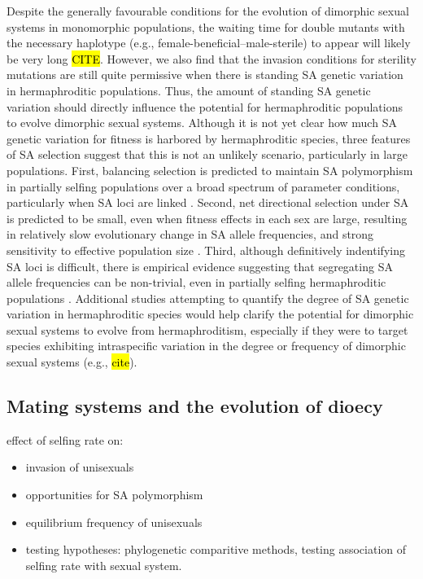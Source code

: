 \documentclass[9pt,twocolumn,twoside,lineno]{gsajnl}
\begin{document}
Despite the generally favourable conditions for the evolution of dimorphic sexual systems in monomorphic populations, the waiting time for double mutants with the necessary haplotype (e.g., female-beneficial--male-sterile) to appear will likely be very long \hl{CITE}. However, we also find that the invasion conditions for sterility mutations are still quite permissive when there is standing SA genetic variation in hermaphroditic populations. Thus, the amount of standing SA genetic variation should directly influence the potential for hermaphroditic populations to evolve dimorphic sexual systems. Although it is not yet clear how much SA genetic variation for fitness is harbored by hermaphroditic species, three features of SA selection suggest that this is not an unlikely scenario, particularly in large populations. First, balancing selection is predicted to maintain SA polymorphism in partially selfing populations over a broad spectrum of parameter conditions, particularly when SA loci are linked \citep{Patten2010,JordanConnallon2014,Olito2017}. Second, net directional selection under SA is predicted to be small, even when fitness effects in each sex are large, resulting in relatively slow evolutionary change in SA allele frequencies, and strong sensitivity to effective population size \citep{ConnallonClark2012}. Third, although definitively indentifying SA loci is difficult, there is empirical evidence suggesting that segregating SA allele frequencies can be non-trivial, even in partially selfing hermaphroditic populations \citep{Barson2015,LeeKelly2015}. Additional studies attempting to quantify the degree of SA genetic variation in hermaphroditic species would help clarify the potential for dimorphic sexual systems to evolve from hermaphroditism, especially if they were to target species exhibiting intraspecific variation in the degree or frequency of dimorphic sexual systems (e.g., \hl{cite}).



\subsection{Mating systems and the evolution of dioecy}

effect of selfing rate on:
\begin{itemize}
	\item invasion of unisexuals
	\item opportunities for SA polymorphism
	\item equilibrium frequency of unisexuals
	\item testing hypotheses: phylogenetic comparitive methods, testing association of selfing rate with sexual system.
\end{itemize}
\end{document}
